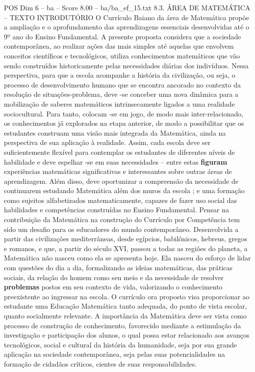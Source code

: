 \begin{textsample}{POS Dim 6 – ba – Score 8.00 – ba/ba\_ef\_15.txt}  \label{ex:f6_pos_076}
8.3.
ÁREA DE MATEMÁTICA – TEXTO INTRODUTÓRIO O Currículo Baiano da área de Matemática propõe a ampliação e o aprofundamento das aprendizagens essenciais desenvolvidas até o 9º ano do Ensino Fundamental.
A presente proposta considera que a sociedade contemporânea, ao realizar ações das mais simples até aquelas que envolvem conceitos científicos e tecnológicos, utiliza conhecimentos matemáticos que vão sendo construídos historicamente pelas necessidades diárias dos indivíduos.
Nessa perspectiva, para que a escola acompanhe a história da civilização, ou seja, o processo de desenvolvimento humano que se encontra ancorado no contexto da resolução de situações-problema, deve -se conceber uma nova dinâmica para a mobilização de saberes matemáticos intrinsecamente ligados a uma realidade sociocultural.
Para tanto, colocam -se em jogo, de modo mais inter-relacionado, os conhecimentos já explorados na etapa anterior, de modo a possibilitar que os estudantes construam uma visão mais integrada da Matemática, ainda na perspectiva de sua aplicação à realidade.
Assim, cada escola deve ser suficientemente flexível para contemplar os estudantes de diferentes níveis de habilidade e deve espelhar -se em suas necessidades – entre estas \textbf{figuram} experiências matemáticas significativas e interessantes sobre outras áreas de aprendizagem.
Além disso, deve oportunizar a compreensão da necessidade de continuarem estudando Matemática além dos muros da escola ; e uma formação como sujeitos alfabetizados matematicamente, capazes de fazer uso social das habilidades e competências construídas no Ensino Fundamental.
Pensar na contribuição da Matemática na construção do Currículo por Competência tem sido um desafio para os educadores do mundo contemporâneo.
Desenvolvida a partir das civilizações mediterrâneas, desde egípcios, babilônicos, hebreus, gregos e romanos, e que, a partir do século XVI, passou a todas as regiões do planeta, a Matemática não nasceu como ela se apresenta hoje.
Ela nasceu do esforço de lidar com questões do dia a dia, formalizando as ideias matemáticas, das práticas sociais, da relação do homem como seu meio e da necessidade de resolver \textbf{problemas} postos em seu contexto de vida, valorizando o conhecimento preexistente ao ingressar na escola.
O currículo ora proposto visa proporcionar ao estudante uma Educação Matemática tanto adequada, do ponto de vista escolar, quanto socialmente relevante.
A importância da Matemática deve ser vista como processo de construção de conhecimento, favorecido mediante a estimulação da investigação e participação dos alunos, o qual possa estar relacionado aos avanços tecnológicos, social e cultural da história da humanidade, seja por sua grande aplicação na sociedade contemporânea, seja pelas suas potencialidades na formação de cidadãos críticos, cientes de suas responsabilidades.

\end{textsample}
